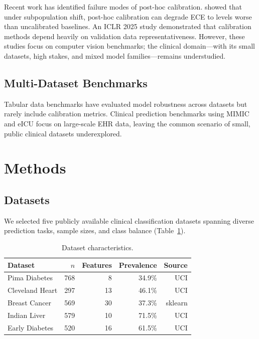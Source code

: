 \documentclass[preprint,12pt]{elsarticle}
\begin{document}
Recent work has identified failure modes of post-hoc calibration. \citet{rethinking2024} showed that under subpopulation shift, post-hoc calibration can degrade ECE to levels worse than uncalibrated baselines. An ICLR 2025 study demonstrated that calibration methods depend heavily on validation data representativeness. However, these studies focus on computer vision benchmarks; the clinical domain---with its small datasets, high stakes, and mixed model families---remains understudied.

\subsection{Multi-Dataset Benchmarks}

Tabular data benchmarks \citep{tableshift2023} have evaluated model robustness across datasets but rarely include calibration metrics. Clinical prediction benchmarks using MIMIC and eICU focus on large-scale EHR data, leaving the common scenario of small, public clinical datasets underexplored.

\section{Methods}
\label{sec:methods}

\subsection{Datasets}

We selected five publicly available clinical classification datasets spanning diverse prediction tasks, sample sizes, and class balance (Table~\ref{tab:datasets}).

\begin{table}[htbp]
\centering
\caption{Dataset characteristics.}
\label{tab:datasets}
\begin{tabular}{lrrrr}
\toprule
\textbf{Dataset} & \textbf{$n$} & \textbf{Features} & \textbf{Prevalence} & \textbf{Source} \\
\midrule
Pima Diabetes     & 768 & 8  & 34.9\% & UCI \\
Cleveland Heart   & 297 & 13 & 46.1\% & UCI \\
Breast Cancer     & 569 & 30 & 37.3\% & sklearn \\
Indian Liver      & 579 & 10 & 71.5\% & UCI \\
Early Diabetes    & 520 & 16 & 61.5\% & UCI \\
\bottomrule
\end{tabular}
\end{table}
\end{document}
